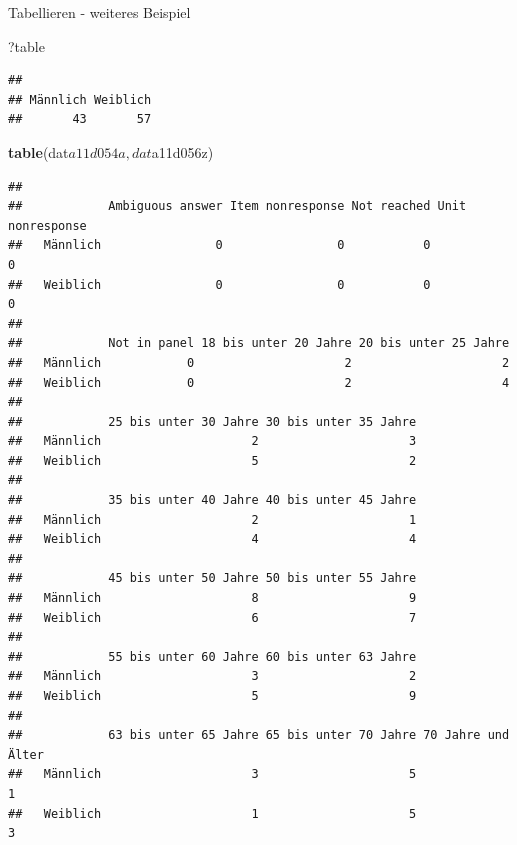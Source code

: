 \documentclass[ignorenonframetext,]{beamer}
\newenvironment{Shaded}{}{}
\newcommand{\KeywordTok}[1]{\textcolor[rgb]{0.00,0.44,0.13}{\textbf{{#1}}}}
\newcommand{\NormalTok}[1]{{#1}}
\begin{document}
\begin{frame}[fragile]{Tabellieren - weiteres Beispiel}

\begin{Shaded}
\begin{Highlighting}[]
\NormalTok{?table}
\end{Highlighting}
\end{Shaded}

\begin{Shaded}
\end{Shaded}

\begin{verbatim}
## 
## Männlich Weiblich 
##       43       57
\end{verbatim}

\begin{Shaded}
\begin{Highlighting}[]
\KeywordTok{table}\NormalTok{(dat$a11d054a,dat$a11d056z)}
\end{Highlighting}
\end{Shaded}

\begin{verbatim}
##           
##            Ambiguous answer Item nonresponse Not reached Unit nonresponse
##   Männlich                0                0           0                0
##   Weiblich                0                0           0                0
##           
##            Not in panel 18 bis unter 20 Jahre 20 bis unter 25 Jahre
##   Männlich            0                     2                     2
##   Weiblich            0                     2                     4
##           
##            25 bis unter 30 Jahre 30 bis unter 35 Jahre
##   Männlich                     2                     3
##   Weiblich                     5                     2
##           
##            35 bis unter 40 Jahre 40 bis unter 45 Jahre
##   Männlich                     2                     1
##   Weiblich                     4                     4
##           
##            45 bis unter 50 Jahre 50 bis unter 55 Jahre
##   Männlich                     8                     9
##   Weiblich                     6                     7
##           
##            55 bis unter 60 Jahre 60 bis unter 63 Jahre
##   Männlich                     3                     2
##   Weiblich                     5                     9
##           
##            63 bis unter 65 Jahre 65 bis unter 70 Jahre 70 Jahre und Älter
##   Männlich                     3                     5                  1
##   Weiblich                     1                     5                  3
\end{verbatim}

\end{frame}
\end{document}
